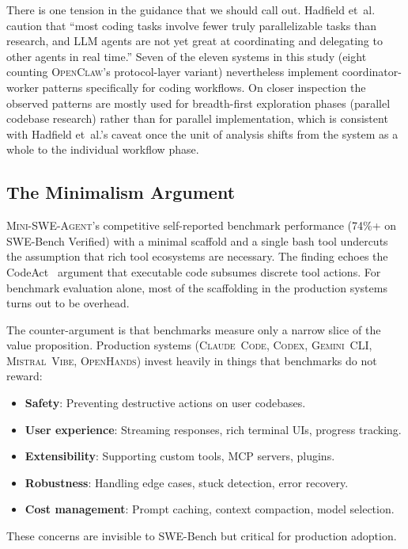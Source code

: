 \documentclass[11pt,a4paper]{article}
\newcommand{\clcode}{\textsc{Claude~Code}\xspace}
\newcommand{\cdx}{\textsc{Codex}\xspace}
\newcommand{\oh}{\textsc{OpenHands}\xspace}
\newcommand{\mswe}{\textsc{Mini-SWE-Agent}\xspace}
\newcommand{\ocl}{\textsc{OpenClaw}\xspace}
\newcommand{\vibe}{\textsc{Mistral~Vibe}\xspace}
\newcommand{\gemini}{\textsc{Gemini~CLI}\xspace}
\begin{document}
There is one tension in the guidance that we should call out.
Hadfield et~al.~\cite{hadfield2025multiagent} caution that ``most coding tasks involve fewer truly parallelizable tasks than research, and LLM agents are not yet great at coordinating and delegating to other agents in real time.''
Seven of the eleven systems in this study (eight counting \ocl{}'s protocol-layer variant) nevertheless implement coordinator-worker patterns specifically for coding workflows.
On closer inspection the observed patterns are mostly used for breadth-first exploration phases (parallel codebase research) rather than for parallel implementation, which is consistent with Hadfield et~al.'s caveat once the unit of analysis shifts from the system as a whole to the individual workflow phase.

\subsection{The Minimalism Argument}

\mswe{}'s competitive self-reported benchmark performance (74\%+ on SWE-Bench Verified) with a minimal scaffold and a single bash tool undercuts the assumption that rich tool ecosystems are necessary.
The finding echoes the CodeAct~\cite{wang2024codeact} argument that executable code subsumes discrete tool actions.
For benchmark evaluation alone, most of the scaffolding in the production systems turns out to be overhead.

The counter-argument is that benchmarks measure only a narrow slice of the value proposition.
Production systems (\clcode{}, \cdx{}, \gemini{}, \vibe{}, \oh{}) invest heavily in things that benchmarks do not reward:
\begin{itemize}[itemsep=1pt]
  \item \textbf{Safety}: Preventing destructive actions on user codebases.
  \item \textbf{User experience}: Streaming responses, rich terminal UIs, progress tracking.
  \item \textbf{Extensibility}: Supporting custom tools, MCP servers, plugins.
  \item \textbf{Robustness}: Handling edge cases, stuck detection, error recovery.
  \item \textbf{Cost management}: Prompt caching, context compaction, model selection.
\end{itemize}

These concerns are invisible to SWE-Bench but critical for production adoption.
\end{document}
